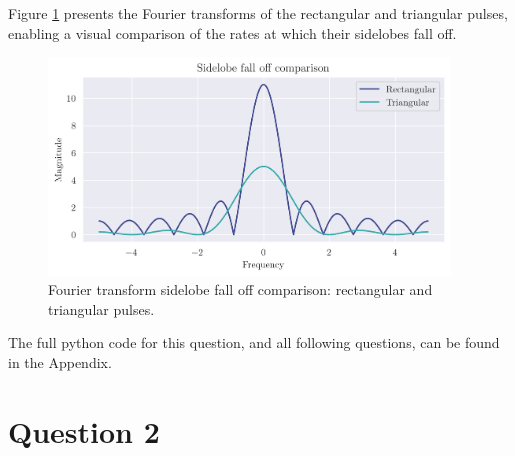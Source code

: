 \documentclass[a4paper, 11pt]{article}
\begin{document}
Figure \ref{fig:q1_sidelobes} presents the Fourier transforms of the rectangular
and triangular pulses, enabling a visual comparison of the rates at which their
sidelobes fall off.

\begin{figure}[ht]
    \centering
    \includegraphics[width=0.95\textwidth]{images/q1_sidelobes.png}
    \caption{Fourier transform sidelobe fall off comparison: rectangular and
             triangular pulses.}
    \label{fig:q1_sidelobes}
\end{figure}

The full python code for this question, and all following questions, can be
found in the Appendix.

\newpage
\section*{Question 2}
\end{document}
